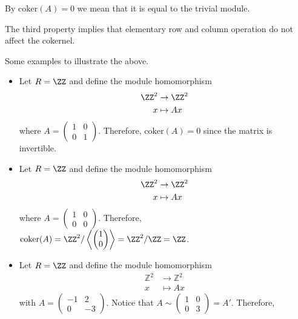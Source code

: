 \documentclass[12pt, a4paper]{article}
\begin{document}
\begin{mdremark}
    By \(\text{coker}(A)=0\) we mean that it is equal to the trivial module.
\end{mdremark}

\begin{mdnote}
    The third property implies that elementary row and column operation do not affect the cokernel.
\end{mdnote}

\begin{mdexample}
    Some examples to illustrate the above.
    \begin{itemize}
        \item Let \(R =\ZZ\) and define the module homomorphism 
        \[\begin{aligned}
            \ZZ^2 &\to \ZZ^2 \\
            x &\mapsto Ax
        \end{aligned}\]
        where \(A = \begin{pmatrix} 1 &0 \\ 0& 1\end{pmatrix}\). Therefore, \(\text{coker}(A)=0\) since the matrix is invertible.
        \item Let \(R =\ZZ\) and define the module homomorphism 
        \[\begin{aligned}
            \ZZ^2 &\to \ZZ^2 \\
            x &\mapsto Ax
        \end{aligned}\]
        where \(A = \begin{pmatrix} 1 &0 \\ 0& 0\end{pmatrix}\). Therefore, \(\text{coker}(A) = \ZZ^2/ \left\langle \begin{pmatrix} 1\\ 0\end{pmatrix} \right\rangle= \ZZ^2/\ZZ= \ZZ\).
        \item Let \(R =\ZZ\) and define the module homomorphism 
        \[\begin{aligned}
            \mathbb{Z}^2 &\to \mathbb{Z}^2 \\
            x &\mapsto Ax
        \end{aligned}\]
        with \(A = \begin{pmatrix} -1 & 2 \\ 0 & -3 \end{pmatrix}\). Notice that \(A \sim \begin{pmatrix} 1 & 0 \\ 0 & 3 \end{pmatrix} = A'\). Therefore, 

\end{itemize}
\end{mdexample}
\end{document}
